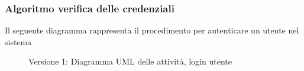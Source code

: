 \subsubsection{Algoritmo verifica delle credenziali}
Il seguente diagramma rappresenta il procedimento per autenticare un utente nel sistema
\vspace{0.5cm}
\begin{figure}[H]
    \centering
    \caption{Versione 1: Diagramma UML delle attività, login utente}
    \label{fig:activity_user_login}
\end{figure}